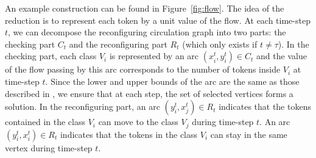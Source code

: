 An example construction can be found in Figure~\ref{fig:flow}. The idea of the reduction is to represent each token by a unit value of the flow.
  At each time-step $t$, we can decompose the reconfiguring circulation graph into two parts: the checking part $C_t$ and the reconfiguring part $R_t$ (which only exists if $t \neq \tau$). In the checking part, each class $V_i$ is represented by an arc $(x^t_i,y^t_i) \in C_t$ and the value of the flow passing by this arc corresponds to the number of tokens inside $V_i$ at time-step $t$. Since the lower and upper bounds of the arc are the same as those described in , we ensure that at each step, the set of selected vertices forms a solution. In the 
reconfiguring part, an arc $(y^t_i,x^t_j) \in R_t$ indicates that the tokens contained in the class $V_i$ can move to the class $V_j$ during time-step $t$. An arc $(y^t_i,x^t_i) \in R_t$ indicates that the tokens in the class $V_i$ can stay in the same vertex during time-step $t$.

